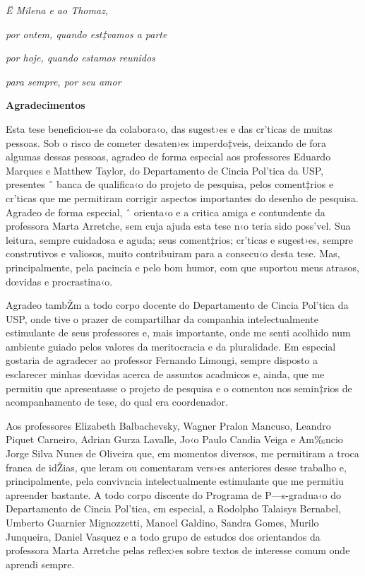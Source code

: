 \documentclass[a4paper, 12pt]{article}
\begin{document}
\pagebreak


\sf \pagestyle{plain}
\thispagestyle{empty}

\emph{Ë Milena e ao Thomaz,} 

\emph{por ontem, quando est‡vamos a parte}

\emph{por hoje, quando estamos reunidos}

\emph{para sempre, por seu amor}


\pagebreak


\sf \pagestyle{plain}
\thispagestyle{empty}
\doublespacing
\begin{center}
\textbf{Agradecimentos}
\end{center}

Esta tese beneficiou-se da colabora‹o, das sugest›es e das cr’ticas de muitas pessoas. Sob o risco de cometer desaten›es imperdo‡veis, deixando de fora algumas dessas pessoas, agradeo de forma especial aos professores Eduardo Marques e Matthew Taylor, do Departamento de Cincia Pol’tica da USP, presentes ˆ banca de qualifica‹o do projeto de pesquisa, pelos coment‡rios e cr’ticas que me permitiram corrigir aspectos importantes do desenho de pesquisa. Agradeo de forma especial, ˆ orienta‹o e a critica amiga e contundente da professora Marta Arretche, sem cuja ajuda esta tese n‹o teria sido poss’vel. Sua leitura, sempre cuidadosa e aguda; seus coment‡rios; cr’ticas e sugest›es, sempre construtivos e valiosos, muito contribuiram para a consecu‹o desta tese. Mas, principalmente, pela pacincia e pelo bom humor, com que suportou meus atrasos, dœvidas e procrastina‹o. 

Agradeo tambŽm a todo corpo docente do Departamento de Cincia Pol’tica da USP, onde tive o prazer de compartilhar da companhia intelectualmente estimulante de seus professores e, mais importante, onde me senti acolhido num ambiente guiado pelos valores da meritocracia e da pluralidade. Em especial gostaria de agradecer ao professor Fernando Limongi, sempre disposto a esclarecer minhas dœvidas acerca de assuntos acadmicos e, ainda, que me permitiu que apresentasse o projeto de pesquisa e o comentou nos semin‡rios de acompanhamento de tese, do qual era coordenador.

Aos professores Elizabeth Balbachevsky, Wagner Pralon Mancuso, Leandro Piquet Carneiro, Adrian Gurza Lavalle, Jo‹o Paulo Candia Veiga e Am‰ncio Jorge Silva Nunes de Oliveira que, em momentos diversos, me permitiram a troca franca de idŽias, que leram ou comentaram vers›es anteriores desse trabalho e, principalmente, pela convivncia intelectualmente estimulante que me permitiu apreender bastante. A todo corpo discente do Programa de P—s-gradua‹o do Departamento de Cincia Pol’tica, em especial, a Rodolpho Talaisys Bernabel, Umberto Guarnier Mignozzetti, Manoel Galdino, Sandra Gomes, Murilo Junqueira, Daniel Vasquez e a todo grupo de estudos dos orientandos da professora Marta Arretche pelas reflex›es sobre textos de interesse comum onde aprendi sempre. 
\end{document}
